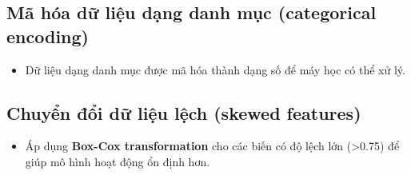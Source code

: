 \subsection{Mã hóa dữ liệu dạng danh mục (categorical encoding)}
\begin{itemize}
    \item Dữ liệu dạng danh mục được mã hóa thành dạng số để máy học có thể xử lý.
\end{itemize}

\subsection{Chuyển đổi dữ liệu lệch (skewed features)}
\begin{itemize}
    \item Áp dụng \textbf{Box-Cox transformation} cho các biến có độ lệch lớn (>0.75) để giúp mô hình hoạt động ổn định hơn.
\end{itemize}

